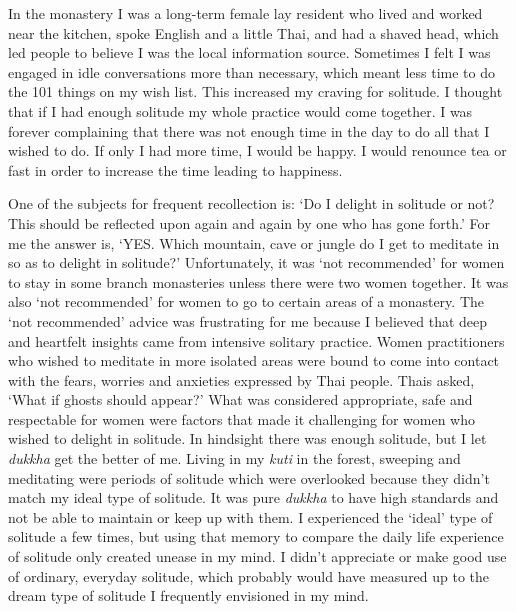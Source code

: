 In the monastery I was a long-term female lay resident who lived and
worked near the kitchen, spoke English and a little Thai, and had a
shaved head, which led people to believe I was the local information
source. Sometimes I felt I was engaged in idle conversations more than
necessary, which meant less time to do the 101 things on my wish list. 
This increased my craving for solitude. I thought that if I had enough
solitude my whole practice would come together. I was forever
complaining that there was not enough time in the day to do all that I
wished to do. If only I had more time, I would be happy. I would
renounce tea or fast in order to increase the time leading to happiness. 

One of the subjects for frequent recollection is: `Do I delight in
solitude or not? This should be reflected upon again and again by one
who has gone forth.' For me the answer is, `YES. Which mountain, cave or
jungle do I get to meditate in so as to delight in solitude?'
Unfortunately, it was `not recommended' for women to stay in some branch
monasteries unless there were two women together. It was also `not
recommended' for women to go to certain areas of a monastery. The `not
recommended' advice was frustrating for me because I believed that deep
and heartfelt insights came from intensive solitary practice. Women
practitioners who wished to meditate in more isolated areas were bound
to come into contact with the fears, worries and anxieties expressed by
Thai people. Thais asked, `What if ghosts should appear?' What was
considered appropriate, safe and respectable for women were factors that
made it challenging for women who wished to delight in solitude. In
hindsight there was enough solitude, but I let \emph{dukkha} get the
better of me. Living in my \emph{kuti} in the forest, sweeping and
meditating were periods of solitude which were overlooked because they
didn't match my ideal type of solitude. It was pure \emph{dukkha} to
have high standards and not be able to maintain or keep up with them. I
experienced the `ideal' type of solitude a few times, but using that
memory to compare the daily life experience of solitude only created
unease in my mind. I didn't appreciate or make good use of ordinary, 
everyday solitude, which probably would have measured up to the dream
type of solitude I frequently envisioned in my mind. 

